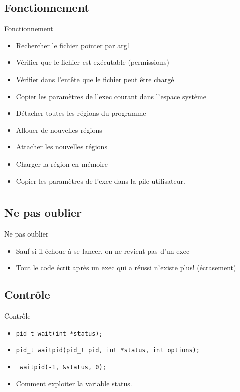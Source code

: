 \begin{frame}{\sectitle}
\def\subsectitle{Fonctionnement}
\subsection{\subsectitle}
\begin{block}{\subsectitle}
\begin{itemize}
    \item Rechercher le fichier pointer par arg1
    \item Vérifier que le fichier est exécutable (permissions)
    \item Vérifier dans l'entête que le fichier peut être chargé
    \item Copier les paramètres de l'exec courant dans l'espace système
    \item Détacher toutes les régions du programme
    \item Allouer de nouvelles régions
    \item Attacher les nouvelles régions
    \item Charger la région en mémoire
    \item Copier les paramètres de l'exec dans la pile utilisateur.
\end{itemize}
\end{block}
\end{frame}

\def\sectitle{}
\section{\sectitle}
\begin{frame}{\sectitle}
\def\subsectitle{Ne pas oublier}
\subsection{\subsectitle}
\begin{block}{\subsectitle}
\begin{itemize}
    \item Sauf si il échoue à se lancer, on ne revient pas d'un exec
    \item Tout le code écrit après un exec qui a réussi n'existe plus!
    (écrasement)
\end{itemize}
\end{block}

\def\subsectitle{Contrôle}
\subsection{\subsectitle}
\begin{block}{\subsectitle}
\begin{itemize}
    \item \texttt{pid\_t wait(int *status);}
    \item \texttt{pid\_t waitpid(pid\_t pid, int *status, int options);}
    \item \texttt{ waitpid(-1, \&status, 0);}
    \item Comment exploiter la variable status.
\end{itemize}
\end{block}

\end{frame}


